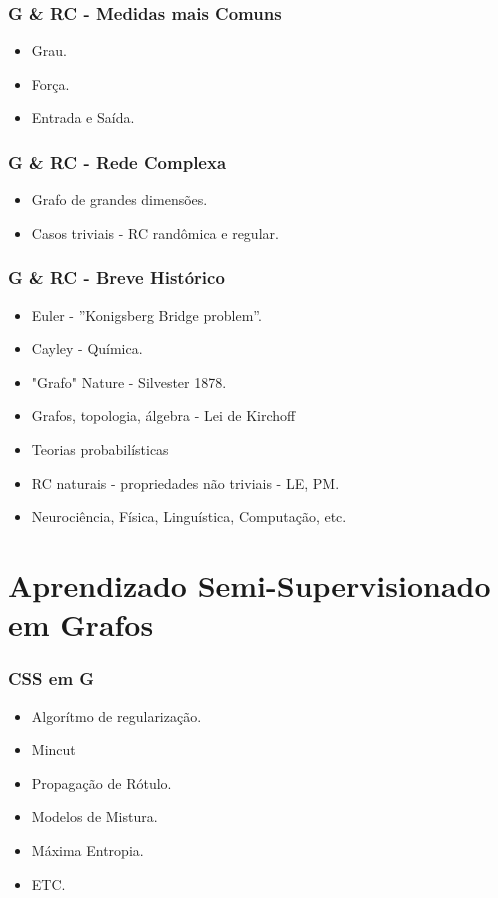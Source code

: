 \documentclass{beamer}
\begin{document}
      \frame
      {
        \frametitle{G \& RC - Medidas mais Comuns}
        \begin{itemize}
          \item <1-> Grau.
          \item <2-> Força.
          \item <3-> Entrada e Saída.
        \end{itemize}
      }

      \frame
      {
        \frametitle{G \& RC - Rede Complexa}
        \begin{itemize}
          \item Grafo de grandes dimensões.

          \item Casos triviais - RC randômica e regular.
        \end{itemize}
      }

      \frame
      {
        \frametitle{G \& RC - Breve Histórico}
        \begin{itemize}
          \item <1-> Euler - ”Konigsberg Bridge problem”.
          \item <2-> Cayley - Química.
          \item <3-> "Grafo" Nature - Silvester 1878.
          \item <4-> Grafos, topologia, álgebra - Lei de Kirchoff
          \item <5-> Teorias probabilísticas
          \item <6-> RC naturais - propriedades não triviais - LE, PM.
          \item <7-> Neurociência, Física, Linguística, Computação, etc.
        \end{itemize}
      }

  \section{Aprendizado Semi-Supervisionado em Grafos}
    \frame{\tableofcontents[current]}

    \frame
    {
      \frametitle{CSS em G}
      \begin{itemize}
        \item Algorítmo de regularização.
        \item Mincut
        \item Propagação de Rótulo.
        \item Modelos de Mistura.
        \item Máxima Entropia.
        \item ETC.
      \end{itemize}
    }
\end{document}
